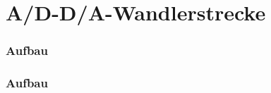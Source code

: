 \section{A/D-D/A-Wandlerstrecke} %
\label{sec:A/D-D/A-Wandlerstrecke}
\begin{frame}
    \frametitle{Aufbau}
    \framesubtitle{}
    \begin{figure}[H]
    \begin{center}
    \end{center}
    \end{figure}
\end{frame}
\begin{frame}
    \frametitle{Aufbau}
    \framesubtitle{}
    \begin{figure}[H]
    \begin{center}
    \end{center}
    \end{figure}
\end{frame}



